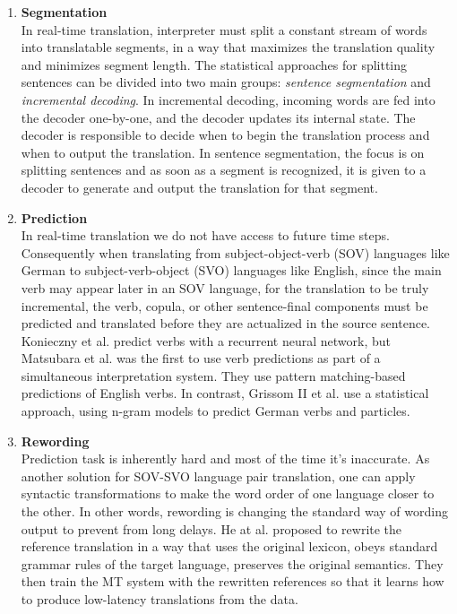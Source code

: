 \documentclass{sfuthesis}
\begin{document}
\begin{enumerate}
    \item \textbf{Segmentation}\\
    In real-time translation, interpreter must split a constant stream of words into translatable segments, in a way that maximizes the translation quality and minimizes segment length. The statistical approaches for splitting sentences can be divided into two main groups: \emph{sentence segmentation} and \emph{incremental decoding}. In incremental decoding, incoming words are fed into the decoder one-by-one, and the decoder updates its internal state. The decoder is responsible to decide when to begin the translation process and when to output the translation. In sentence segmentation, the focus is on splitting sentences and as soon as a segment is recognized, it is given to a decoder to generate and output the translation for that segment.
    \item \textbf{Prediction}\\
    In real-time translation we do not have access to future time steps. Consequently when translating from subject-object-verb (SOV) languages like German to subject-verb-object (SVO) languages like English, since the main verb may appear later in an SOV language, for the translation to be truly incremental, the verb, copula, or other sentence-final components must be predicted and translated before they are actualized in the source sentence.\\
    Konieczny et al. \cite{doring:2003:ICCS} predict verbs with a recurrent neural network, but Matsubara et al. \cite{matsubarayx:2000:NLP} was the first to use verb predictions as part of a simultaneous interpretation system. They use pattern matching-based predictions of English verbs. In contrast, Grissom II et al. \cite{Grissom:2014:EMNLP} use a statistical approach, using n-gram models to predict German verbs and particles.
    \item \textbf{Rewording}\\
    Prediction task is inherently hard and most of the time it's inaccurate. As another solution for SOV-SVO language pair translation, one can apply syntactic transformations to make the word order of one language closer to the other. In other words, rewording is changing the standard way of wording output to prevent from long delays. He at al. \cite{he:2015:EMNLP} proposed to rewrite the reference translation in a way that uses the original lexicon, obeys standard grammar rules of the target language, preserves the original semantics. They then train the MT system with the rewritten references so that it learns how to produce low-latency translations from the data.

\end{enumerate}
\end{document}
